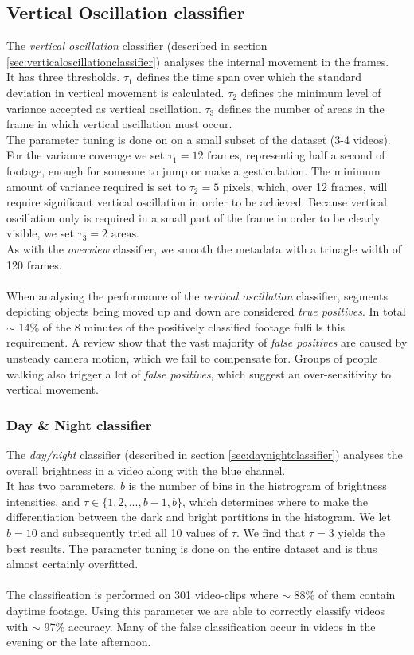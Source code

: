 \subsection{Vertical Oscillation classifier}
%
The \textit{vertical oscillation} classifier (described in section \ref{sec:verticaloscillationclassifier}) analyses the internal movement in the frames.\\
It has three thresholds. $\tau_1$ defines the time span over which the standard deviation in vertical movement is calculated. $\tau_2$ defines the minimum level of variance accepted as vertical oscillation. $\tau_3$ defines the number of areas in the frame in which vertical oscillation must occur.\\
The parameter tuning is done on on a small subset of the dataset (3-4 videos). For the variance coverage we set $\tau_1 = 12 \text{ frames}$, representing half a second of footage, enough for someone to jump or make a gesticulation. The minimum amount of variance required is set to $\tau_2 = 5 \text{ pixels}$, which, over 12 frames, will require significant vertical oscillation in order to be achieved. Because vertical oscillation only is required in a small part of the frame in order to be clearly visible, we set $\tau_3 = 2 \text{ areas}$.\\
As with the \textit{overview} classifier, we smooth the metadata with a trinagle width of 120 frames.\\
\\
When analysing the performance of the \textit{vertical oscillation} classifier, segments depicting objects being moved up and down are considered \textit{true positives}. In total $\sim$ 14\% of the 8 minutes of the positively classified footage fulfills this requirement. A review show that the vast majority of \textit{false positives} are caused by unsteady camera motion, which we fail to compensate for. Groups of people walking also trigger a lot of \textit{false positives}, which suggest an over-sensitivity to vertical movement.
%
%
\subsubsection{Day \& Night classifier}
%
The \textit{day/night} classifier (described in section \ref{sec:daynightclassifier}) analyses the overall brightness in a video along with the blue channel.\\
It has two parameters. $b$ is the number of bins in the histrogram of brightness intensities, and $\tau \in \{1,2,...,b-1,b\}$, which determines where to make the differentiation between the dark and bright partitions in the histogram. We let $b = 10$ and subsequently tried all 10 values of $\tau$. We find that $\tau = 3$ yields the best results. The parameter tuning is done on the entire dataset and is thus almost certainly overfitted.\\
\\
The classification is performed on 301 video-clips where $\sim$ 88\% of them contain daytime footage. Using this parameter we are able to correctly classify videos with $\sim$ 97\% accuracy. Many of the false classification occur in videos in the evening or the late afternoon.
%
